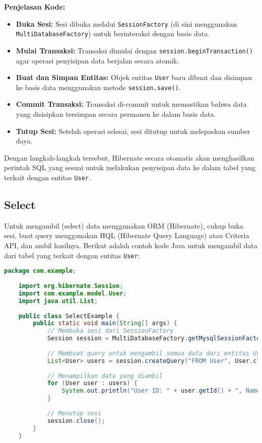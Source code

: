 \textbf{Penjelasan Kode:}
\begin{itemize}
	\item \textbf{Buka Sesi:} Sesi dibuka melalui \texttt{SessionFactory} (di sini menggunakan \texttt{MultiDatabaseFactory}) untuk berinteraksi dengan basis data.
	\item \textbf{Mulai Transaksi:} Transaksi dimulai dengan \texttt{session.beginTransaction()} agar operasi penyisipan data berjalan secara atomik.
	\item \textbf{Buat dan Simpan Entitas:} Objek entitas \texttt{User} baru dibuat dan disimpan ke basis data menggunakan metode \texttt{session.save()}.
	\item \textbf{Commit Transaksi:} Transaksi di-commit untuk memastikan bahwa data yang disisipkan tersimpan secara permanen ke dalam basis data.
	\item \textbf{Tutup Sesi:} Setelah operasi selesai, sesi ditutup untuk melepaskan sumber daya.
\end{itemize}

Dengan langkah-langkah tersebut, Hibernate secara otomatis akan menghasilkan perintah SQL yang sesuai untuk melakukan penyisipan data ke dalam tabel yang terkait dengan entitas \texttt{User}.

\subsection{Select}

Untuk mengambil (select) data menggunakan ORM (Hibernate), cukup buka sesi, buat query menggunakan HQL (Hibernate Query Language) atau Criteria API, dan ambil hasilnya. Berikut adalah contoh kode Java untuk mengambil data dari tabel yang terkait dengan entitas \texttt{User}:

\begin{lstlisting}[language=Java, style=JavaStyle]
	package com.example;
	
	import org.hibernate.Session;
	import com.example.model.User;
	import java.util.List;
	
	public class SelectExample {
		public static void main(String[] args) {
			// Membuka sesi dari SessionFactory
			Session session = MultiDatabaseFactory.getMysqlSessionFactory().openSession();
			
			// Membuat query untuk mengambil semua data dari entitas User
			List<User> users = session.createQuery("FROM User", User.class).list();
			
			// Menampilkan data yang diambil
			for (User user : users) {
				System.out.println("User ID: " + user.getId() + ", Name: " + user.getName());
			}
			
			// Menutup sesi
			session.close();
		}
	}
\end{lstlisting}

